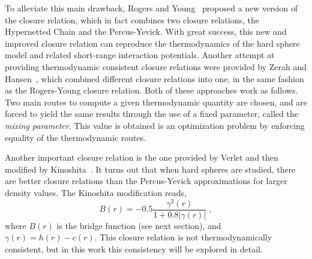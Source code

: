 To alleviate this main drawback, Rogers and Young~\cite{rogersNewThermodynamicallyConsistent1984b}
proposed a new version of the closure relation, which in fact combines two closure 
relations, the Hypernetted Chain and the Percus-Yevick. With great success, this new
and improved closure relation can reproduce the thermodynamics of the hard sphere model
and related short-range interaction potentials. Another attempt at providing thermodynamic
consistent closure relations were provided by Zerah and Hansen~\cite{zerahSelfConsistentIntegral1986},
which combined different closure relations into one, in the same fashion as the Rogers-Young
closure relation. Both of these approaches work as follows. Two main routes to compute a 
given thermodynamic quantity are chosen, and are forced to yield the same results through 
the use of a fixed parameter, called the \emph{mixing parameter}. This value is obtained is 
an optimization problem by enforcing equality of the thermodynamic routes.

Another important closure relation is the one provided by Verlet and then modified by
Kinoshita~\cite{kinoshitaInteractionSurfacesSolvophobicity2003}. It turns out that
when hard spheres are studied, there are better closure relations than the
Percus-Yevick approximations for larger density values.
The Kinoshita modification reads,
\begin{equation}
    B(r) = - 0.5 \frac{\gamma^2 (r)}{1 + 0.8 \lvert \gamma (r) \rvert} \; ,
    \label{eq:kinoshita}
\end{equation}
where $B(r)$ is the bridge function (see next section), and $\gamma(r)=h(r)-c(r)$.
This closure relation is not thermodynamically consistent, but in this work this
consistency will be explored in detail.

